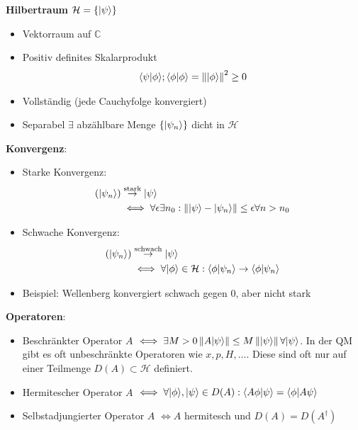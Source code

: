 \documentclass[11pt,a4paper]{report}
\newcommand{\norm}[1]{\left\lVert #1 \right\rVert}
\begin{document}
\textbf{Hilbertraum} $\mathcal{H} = \{ |\psi\rangle \}$
\begin{itemize}
    \item Vektorraum auf $\mathbb{C}$
    \item Positiv definites Skalarprodukt
    \begin{align*}
        \braket{\psi}{\phi}; \braket{\phi}{\phi} = \norm{\ket{\phi}}^2 \geq 0
    \end{align*}
    \item Vollständig (jede Cauchyfolge konvergiert)
    \item Separabel $\exists$ abzählbare Menge $\{ |\psi_n\rangle \}$ dicht in $\mathcal{H}$
\end{itemize}

\textbf{Konvergenz}:
\begin{itemize}
    \item Starke Konvergenz:
    \begin{align*}
        (\ket{\psi_n}) &\stackrel{\text{stark}}{\rightarrow} \ket{\psi} \\
        &\iff \forall \epsilon \exists n_0 : \norm{\ket{\psi} - \ket{\psi_n}} \leq \epsilon \forall n > n_0
    \end{align*}
    \item Schwache Konvergenz:
    \begin{align*}
        (|\psi_n\rangle) &\stackrel{\text{schwach}}{\rightarrow} |\psi\rangle \\
        &\iff \forall |\phi\rangle \in \mathcal{H} : \langle \phi|\psi_n\rangle \rightarrow \langle \phi|\psi_n\rangle
    \end{align*}
    \item Beispiel: Wellenberg konvergiert schwach gegen $0$, aber nicht stark
\end{itemize}

\textbf{Operatoren}:
\begin{itemize}
    \item Beschränkter Operator $A$ $\iff \exists M > 0 \norm{A \ket{\psi}} \leq M \norm{\ket{\psi}} \forall \ket{\psi}$. In der QM gibt es oft unbeschränkte Operatoren wie $x, p, H, \ldots$. Diese sind oft nur auf einer Teilmenge $D(A) \subset \mathcal{H}$ definiert.
    \item Hermitescher Operator $A$ $\iff \forall |\phi\rangle, |\psi\rangle \in D(A): \langle A \phi|\psi\rangle = \langle \phi|A \psi\rangle$
    \item Selbstadjungierter Operator $A$ $\iff A$ hermitesch und $D(A) = D(A^\dagger)$
\end{itemize}
\end{document}
